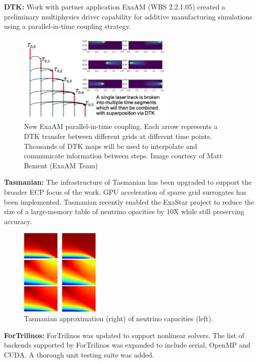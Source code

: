 {\bf DTK:} Work with partner application ExaAM (WBS 2.2.1.05) created a
preliminary multiphysics driver capability for additive manufacturing
simulations using a parallel-in-time coupling strategy.

\begin{figure}[htb]
        \centering \includegraphics[width=3.0in]{projects/2.3.3-MathLibs/2.3.3.14-ALExa-ForTrilinos/dtk_exaam_pit.png} \caption{\label{fig:dtk-exaam-pit}
        New ExaAM parallel-in-time coupling. Each arrow represents a DTK
        transfer between different grids at different time points. Thousands
        of DTK maps will be used to interpolate and communicate information
        between steps. Image courtesy of Matt Bement (ExaAM Team) }
\end{figure}

{\bf Tasmanian:} The infrastructure of Tasmanian has been upgraded to support
the broader ECP focus of the work.  GPU acceleration of sparse grid surrogates
has been implemented.  Tasmanian recently enabled the ExaStar project to
reduce the size of a large-memory table of neutrino opacities by 10X while
still preserving accuracy.

\begin{figure}[htb]
        \centering
        \includegraphics[width=1.5in]{projects/2.3.3-MathLibs/2.3.3.14-ALExa-ForTrilinos/tasmanian-gpu}
        \caption{\label{fig:tasmanian-gpu}Tasmanian approximation (right) of neutrino capacities (left).}
\end{figure}

{\bf ForTrilinos:} ForTrilinos was updated to support nonlinear solvers. The
list of backends supported by ForTrilinos was expanded to include serial,
OpenMP and CUDA. A thorough unit testing suite was added.

